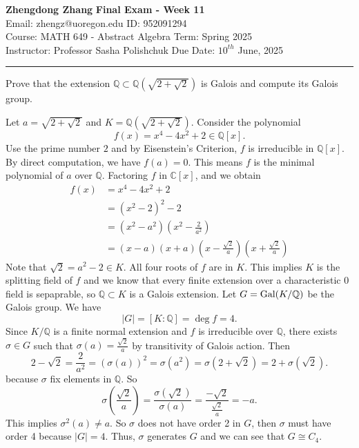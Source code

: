 \documentclass[letterpaper, 12pt]{article}
\begin{document}
\noindent
\large\textbf{Zhengdong Zhang} \hfill \textbf{Final Exam - Week 11} \\
Email: zhengz@uoregon.edu \hfill ID: 952091294 \\
\normalsize Course: MATH 649 - Abstract Algebra \hfill Term: Spring 2025 \\
Instructor: Professor Sasha Polishchuk \hfill Due Date: $10^{th}$ June, 2025 \\
\noindent\rule{7in}{2.8pt}
\begin{problem}{1}
Prove that the extension \(\mathbb{Q}\subset \mathbb{Q}(\sqrt{2+\sqrt{2}})\) is Galois and compute its Galois group.
\end{problem}
\begin{solution}
Let \(a=\sqrt{2+\sqrt{2}}\) and \(K=\mathbb{Q}(\sqrt{2+\sqrt{2}})\). Consider the polynomial 
\[f(x)=x^4-4x^2+2\in \mathbb{Q}[x].\]
Use the prime number \(2\) and by Eisenstein's Criterion, \(f\) is irreducible in \(\mathbb{Q}[x]\). By direct computation, we have \(f(a)=0\). This means \(f\) is the minimal polynomial of \(a\) over \(\mathbb{Q}\). Factoring \(f\) in \(\mathbb{C}[x]\), and we obtain 
\begin{align*}
    f(x)&=x^4-4x^2+2\\ 
        &=(x^2-2)^2-2\\ 
        &=(x^2-a^2)(x^2-\frac{2}{a^2})\\ 
        &=(x-a)(x+a)(x-\frac{\sqrt{2}}{a})(x+\frac{\sqrt{2}}{a})
\end{align*}
Note that \(\sqrt{2}=a^2-2\in K\). All four roots of \(f\) are in \(K\). This implies \(K\) is the splitting field of \(f\) and we know that every finite extension over a characteristic 0 field is sepaprable, so \(\mathbb{Q}\subset K\) is a Galois extension. Let \(G=\text{Gal}(K/\mathbb{Q})\) be the Galois group. We have 
\[|G|=[K:\mathbb{Q}]=\deg f=4.\]
Since \(K/\mathbb{Q}\) is a finite normal extension and \(f\) is irreducible over \(\mathbb{Q}\), there exists \(\sigma\in G\) such that \(\sigma(a)=\frac{\sqrt{2}}{a}\) by transitivity of Galois action. Then 
\[2-\sqrt{2}=\frac{2}{a^2}=(\sigma(a))^2=\sigma(a^2)=\sigma(2+\sqrt{2})=2+\sigma(\sqrt{2}).\]
because \(\sigma\) fix elements in \(\mathbb{Q}\). So 
\[\sigma(\frac{\sqrt{2}}{a})=\frac{\sigma(\sqrt{2})}{\sigma(a)}=\frac{-\sqrt{2}}{\frac{\sqrt{2}}{a}}=-a.\]
This implies \(\sigma^2(a)\neq a\). So \(\sigma\) does not have order 2 in \(G\), then \(\sigma\) must have order 4 because \(|G|=4\). Thus, \(\sigma\) generates \(G\) and we can see that \(G\cong C_4\). 
\end{solution}
\end{document}
